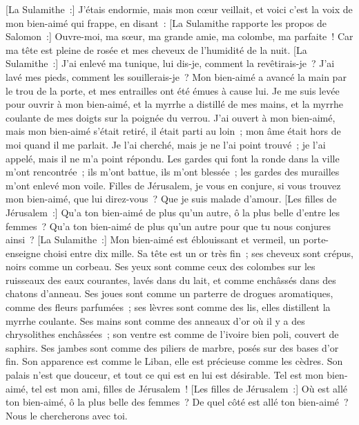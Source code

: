 \begin{multicols}{2}
[La Sulamithe~:] J'étais endormie, mais mon cœur veillait, et voici c'est la voix de mon bien-aimé qui frappe, en disant~: [La Sulamithe rapporte les propos de Salomon~:] Ouvre-moi, ma sœur, ma grande amie, ma colombe, ma parfaite~! Car ma tête est pleine de rosée et mes cheveux de l'humidité de la nuit.
[La Sulamithe~:] J'ai enlevé ma tunique, lui dis-je, comment la revêtirais-je~? J'ai lavé mes pieds, comment les souillerais-je~?
Mon bien-aimé a avancé la main par le trou de la porte, et mes entrailles ont été émues à cause lui.
Je me suis levée pour ouvrir à mon bien-aimé, et la myrrhe a distillé de mes mains, et la myrrhe coulante de mes doigts sur la poignée du verrou.
J'ai ouvert à mon bien-aimé, mais mon bien-aimé s'était retiré, il était parti au loin~; mon âme était hors de moi quand il me parlait. Je l'ai cherché, mais je ne l'ai point trouvé~; je l'ai appelé, mais il ne m'a point répondu.
Les gardes qui font la ronde dans la ville m'ont rencontrée~; ils m'ont battue, ils m'ont blessée~; les gardes des murailles m'ont enlevé mon voile.
Filles de Jérusalem, je vous en conjure, si vous trouvez mon bien-aimé, que lui direz-vous~? Que je suis malade d'amour.
[Les filles de Jérusalem~:] Qu'a ton bien-aimé de plus qu'un autre, ô la plus belle d'entre les femmes~? Qu'a ton bien-aimé de plus qu'un autre pour que tu nous conjures ainsi~?
[La Sulamithe~:] Mon bien-aimé est éblouissant et vermeil, un porte-enseigne choisi entre dix mille.
Sa tête est un or très fin~; ses cheveux sont crépus, noirs comme un corbeau.
Ses yeux sont comme ceux des colombes sur les ruisseaux des eaux courantes, lavés dans du lait, et comme enchâssés dans des chatons d'anneau. 
Ses joues sont comme un parterre de drogues aromatiques, comme des fleurs parfumées~; ses lèvres sont comme des lis, elles distillent la myrrhe coulante. 
Ses mains sont comme des anneaux d'or où il y a des chrysolithes enchâssées~; son ventre est comme de l'ivoire bien poli, couvert de saphirs.
Ses jambes sont comme des piliers de marbre, posés sur des bases d'or fin. Son apparence est comme le Liban, elle est précieuse comme les cèdres.
Son palais n'est que douceur, et tout ce qui est en lui est désirable. Tel est mon bien-aimé, tel est mon ami, filles de Jérusalem~!
\VerseOne{}[Les filles de Jérusalem~:] Où est allé ton bien-aimé, ô la plus belle des femmes~? De quel côté est allé ton bien-aimé~? Nous le chercherons avec toi.

\end{multicols}
